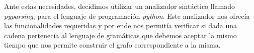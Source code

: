 \documentclass[a4paper]{report}
\begin{document}
Ante estas necesidades, decidimos utilizar un analizador sintáctico llamado \emph{pyparsing}, para el lenguaje de programación \emph{python}. Este analizador nos ofrecía las funcionalidades requeridas y por ende nos permitía verificar si dada una cadena pertenecía al lenguaje de gramáticas que debemos aceptar la mismo tiempo que nos permite construir el grafo correspondiente a la misma.





	
\end{document}
